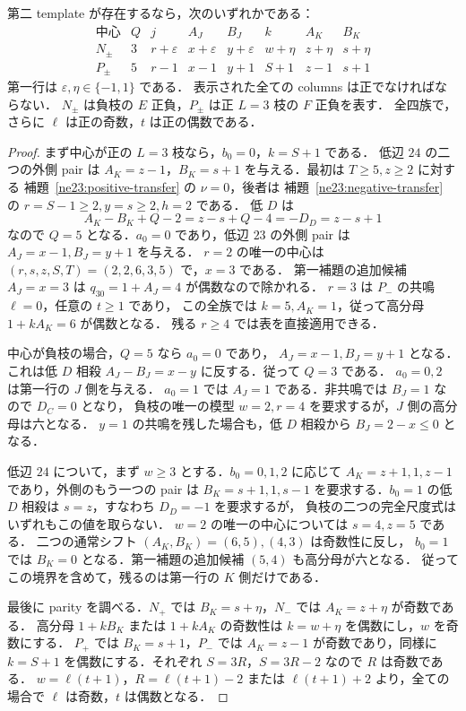 \begin{lemma}
\label{ne23:shift-table}
第二 template が存在するなら，次のいずれかである：
\[
\begin{array}{c|c|ccc|ccc}
\text{中心}&Q&j&A_J&B_J&k&A_K&B_K\\\hline
N_\pm&3&r+\varepsilon&x+\varepsilon&y+\varepsilon&w+\eta&z+\eta&s+\eta\\
P_\pm&5&r-1&x-1&y+1&S+1&z-1&s+1
\end{array}
\]
第一行は $\varepsilon,\eta\in\{-1,1\}$ である．
表示された全ての columns は正でなければならない．
$N_\pm$ は負枝の $E$ 正負，$P_\pm$ は正 $L=3$ 枝の $F$ 正負を表す．
全四族で，さらに $\ell$ は正の奇数，$t$ は正の偶数である．
\end{lemma}

\begin{proof}
まず中心が正の $L=3$ 枝なら，$b_0=0$，$k=S+1$ である．
低辺 $24$ の二つの外側 pair は
$A_K=z-1$，$B_K=s+1$ を与える．最初は $T\ge5,z\ge2$ に対する
補題~\ref{ne23:positive-transfer} の $\nu=0$，後者は
補題~\ref{ne23:negative-transfer} の $r=S-1\ge2,y=s\ge2,h=2$ である．
低 $D$ は
\[
 A_K-B_K+Q-2=z-s+Q-4=-D_D=z-s+1
\]
なので $Q=5$ となる．$a_0=0$ であり，低辺 $23$ の外側 pair は
$A_J=x-1,B_J=y+1$ を与える．
$r=2$ の唯一の中心は $(r,s,z,S,T)=(2,2,6,3,5)$ で，$x=3$ である．
第一補題の追加候補 $A_J=x=3$ は $q_{30}=1+A_J=4$ が偶数なので除かれる．
$r=3$ は $P_-$ の共鳴 $\ell=0$，任意の $t\ge1$ であり，
この全族では $k=5,A_K=1$，従って高分母 $1+kA_K=6$ が偶数となる．
残る $r\ge4$ では表を直接適用できる．

中心が負枝の場合，$Q=5$ なら $a_0=0$ であり，
$A_J=x-1,B_J=y+1$ となる．これは低 $D$ 相殺
$A_J-B_J=x-y$ に反する．従って $Q=3$ である．
$a_0=0,2$ は第一行の $J$ 側を与える．
$a_0=1$ では $A_J=1$ である．非共鳴では $B_J=1$ なので $D_C=0$ となり，
負枝の唯一の模型 $w=2,r=4$ を要求するが，$J$ 側の高分母は六となる．
$y=1$ の共鳴を残した場合も，低 $D$ 相殺から $B_J=2-x\le0$ となる．

低辺 $24$ について，まず $w\ge3$ とする．$b_0=0,1,2$ に応じて
$A_K=z+1,1,z-1$ であり，外側のもう一つの pair は
$B_K=s+1,1,s-1$ を要求する．$b_0=1$ の低 $D$ 相殺は $s=z$，すなわち $D_D=-1$ を要求するが，
負枝の二つの完全尺度式はいずれもこの値を取らない．
$w=2$ の唯一の中心については $s=4,z=5$ である．
二つの通常シフト $(A_K,B_K)=(6,5),(4,3)$ は奇数性に反し，
$b_0=1$ では $B_K=0$ となる．第一補題の追加候補 $(5,4)$ も高分母が六となる．
従ってこの境界を含めて，残るのは第一行の $K$ 側だけである．

最後に parity を調べる．$N_+$ では $B_K=s+\eta$，$N_-$ では $A_K=z+\eta$ が奇数である．
高分母 $1+kB_K$ または $1+kA_K$ の奇数性は $k=w+\eta$ を偶数にし，$w$ を奇数にする．
$P_+$ では $B_K=s+1$，$P_-$ では $A_K=z-1$ が奇数であり，同様に
$k=S+1$ を偶数にする．それぞれ $S=3R$，$S=3R-2$ なので $R$ は奇数である．
$w=\ell(t+1)$，$R=\ell(t+1)-2$ または $\ell(t+1)+2$ より，全ての場合で
$\ell$ は奇数，$t$ は偶数となる．
\end{proof}

